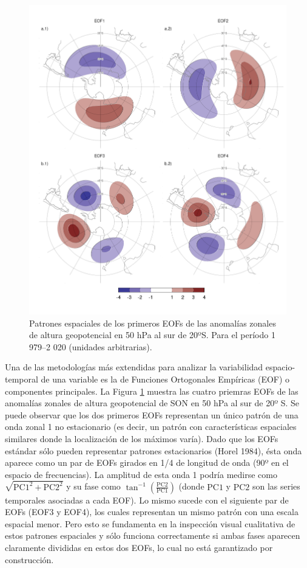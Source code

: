 \documentclass[12pt,oneside,a4paper]{reedthesis}
\begin{document}
\begin{figure}

{\centering \includegraphics{figures/20-ceofs/eof-naive-1} 

}

\caption{Patrones espaciales de los primeros EOFs de las anomalías zonales de altura geopotencial en 50 hPa al sur de 20ºS. Para el período 1 979--2 020 (unidades arbitrarias).}\label{fig:eof-naive}
\end{figure}

Una de las metodologías más extendidas para analizar la variabilidad espacio-temporal de una variable es la de Funciones Ortogonales Empíricas (EOF) o componentes principales.
La Figura \ref{fig:eof-naive} muestra las cuatro priemras EOFs de las anomalías zonales de altura geopotencial de SON en 50 hPa al sur de 20º S.
Se puede observar que los dos primeros EOFs representan un único patrón de una onda zonal 1 no estacionario (es decir, un patrón con características espaciales similares donde la localización de los máximos varía).
Dado que los EOFs estándar sólo pueden representar patrones estacionarios (Horel 1984), ésta onda aparece como un par de EOFs girados en 1/4 de longitud de onda (90º en el espacio de frecuencias).
La amplitud de esta onda 1 podría medirse como \(\sqrt{\mathrm{PC1}^2 + \mathrm{PC2}^2}\) y su fase como \(\tan^{-1} \left ( \frac{\mathrm{PC2}}{\mathrm{PC1}} \right )\) (donde \(\mathrm{PC1}\) y \(\mathrm{PC2}\) son las series temporales asociadas a cada EOF).
Lo mismo sucede con el siguiente par de EOFs (EOF3 y EOF4), los cuales representan un mismo patrón con una escala espacial menor.
Pero esto se fundamenta en la inspección visual cualitativa de estos patrones espaciales y sólo funciona correctamente si ambas fases aparecen claramente divididas en estos dos EOFs, lo cual no está garantizado por construcción.
\end{document}
